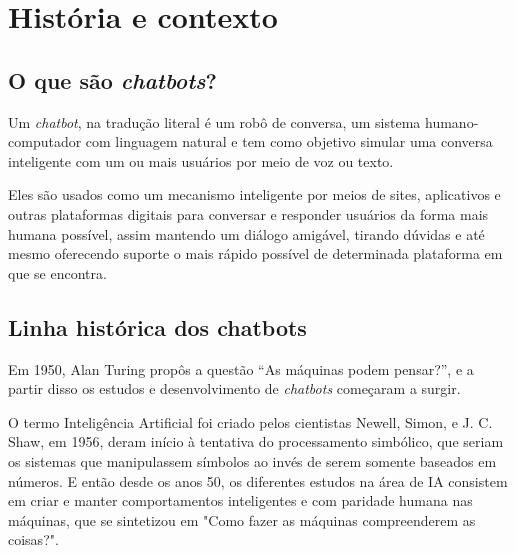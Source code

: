 \documentclass[
	12pt,				%
	oneside,
	a4paper,			%
	english,			%
	french,				%
	spanish,			%
	brazil				%
	]{abntex2}
\begin{document}
\section{História e contexto}

\subsection{O que são \emph{chatbots}?}
Um \emph{chatbot}, na tradução literal é um robô de conversa, um sistema humano-computador com linguagem natural e tem como objetivo simular uma conversa inteligente com um ou mais usuários por meio de voz ou texto. 

Eles são usados como um mecanismo inteligente por meios de sites, aplicativos e outras plataformas digitais para conversar e responder usuários da forma mais humana possível, assim mantendo um diálogo amigável, tirando dúvidas e até mesmo oferecendo suporte o mais rápido possível de determinada plataforma em que se encontra.

\subsection{Linha histórica dos chatbots}
Em 1950, Alan Turing propôs a questão “As máquinas podem pensar?”, e a partir disso os estudos e desenvolvimento de \emph{chatbots} começaram a surgir.


O termo Inteligência Artificial foi criado pelos cientistas Newell, Simon, e J. C. Shaw, em 1956, deram início à tentativa do processamento simbólico, que seriam os sistemas que manipulassem símbolos ao invés de serem somente baseados em números.
E então desde os anos 50, os diferentes estudos na área de IA consistem em criar e manter comportamentos inteligentes e com paridade humana nas máquinas, que se sintetizou em "Como fazer as máquinas compreenderem as coisas?"\supercite{minsky}.
\end{document}
